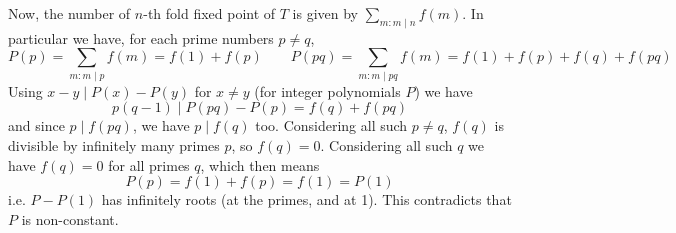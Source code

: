 \documentclass[11pt,a4paper]{article}
\begin{document}
\begin{enumerate}
    	Now, the number of $n$-th fold fixed point of $T$ is given by $\sum_{m: m\mid n} f(m)$. In particular we have, for each prime numbers $p\neq q$, 
    	\[
    	P(p) = \sum_{m: m\mid p} f(m) = f(1)+f(p)
    	\qquad 
    	P(pq) = \sum_{m: m\mid pq} f(m) = f(1)+f(p) + f(q) + f(pq)
    	\]
    	Using $x-y\mid P(x)-P(y)$ for $x\neq y$ (for integer polynomials $P$) we have 
    	\[
    	p(q - 1) \mid P(pq) - P(p) = f(q) + f(pq)
    	\]
    	and since $p\mid f(pq)$, we have $p\mid f(q)$ too. 
    	Considering all such $p\neq q$, $f(q)$ is divisible by infinitely many primes $p$, so $f(q)=0$. 
    	Considering all such $q$ we have $f(q)=0$ for all primes $q$, which then means 
    	\[
    	P(p)=f(1)+f(p)=f(1)=P(1)
    	\]
    	i.e. $P - P(1)$ has infinitely roots (at the primes, and at 1). 
    	This contradicts that $P$ is non-constant. 
    	
    \end{enumerate}
\end{document}
